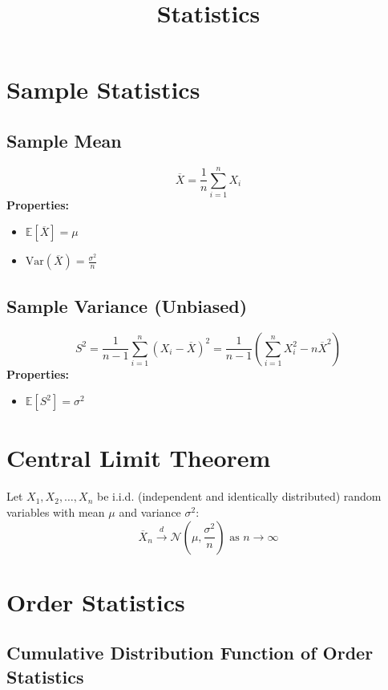 \documentclass{article}
\title{Statistics}
\date{}
\begin{document}
\maketitle

\tableofcontents

\newpage
\section{Sample Statistics}

\subsection{Sample Mean}
\[
    \overline{X} = \frac{1}{n}\sum_{i=1}^{n} X_i
\]
\textbf{Properties:}
\begin{itemize}
    \item $\mathbb{E}[\overline{X}] = \mu$
    \item $\text{Var}(\overline{X}) = \frac{\sigma^2}{n}$
\end{itemize}

\subsection{Sample Variance (Unbiased)}
\[
    S^2 = \frac{1}{n-1}\sum_{i=1}^{n}(X_i - \overline{X})^2 = \frac{1}{n-1}\left(\sum_{i=1}^{n} X_i^2 - n\overline{X}^2\right)
\]
\textbf{Properties:}
\begin{itemize}
    \item $\mathbb{E}[S^2] = \sigma^2$
\end{itemize}


\newpage
\section{Central Limit Theorem}

Let $X_1, X_2, \ldots, X_n$ be i.i.d. (independent and identically distributed) random variables with mean $\mu$ and variance $\sigma^2$:
\[
    \overline{X}_n \overset{d}{\rightarrow} \mathcal{N}\left(\mu, \frac{\sigma^2}{n}\right) \text{ as } n \rightarrow \infty
\]


\newpage
\section{Order Statistics}

\subsection{Cumulative Distribution Function of Order Statistics}
\end{document}
